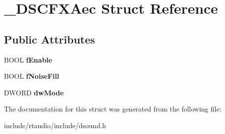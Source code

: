 \hypertarget{struct___d_s_c_f_x_aec}{}\section{\+\_\+\+D\+S\+C\+F\+X\+Aec Struct Reference}
\label{struct___d_s_c_f_x_aec}
\subsection*{Public Attributes}
\begin{DoxyCompactItemize}
\item 
B\+O\+OL {\bfseries f\+Enable}\hypertarget{struct___d_s_c_f_x_aec_a64c2c3b23ff26b8a52fbbc9350607670}{}\label{struct___d_s_c_f_x_aec_a64c2c3b23ff26b8a52fbbc9350607670}

\item 
B\+O\+OL {\bfseries f\+Noise\+Fill}\hypertarget{struct___d_s_c_f_x_aec_a3d1275c5eb900774656fab9a4d9aee5d}{}\label{struct___d_s_c_f_x_aec_a3d1275c5eb900774656fab9a4d9aee5d}

\item 
D\+W\+O\+RD {\bfseries dw\+Mode}\hypertarget{struct___d_s_c_f_x_aec_a7752b5468727691ac31f229fa6bc536f}{}\label{struct___d_s_c_f_x_aec_a7752b5468727691ac31f229fa6bc536f}

\end{DoxyCompactItemize}


The documentation for this struct was generated from the following file\+:\begin{DoxyCompactItemize}
\item 
include/rtaudio/include/dsound.\+h\end{DoxyCompactItemize}
